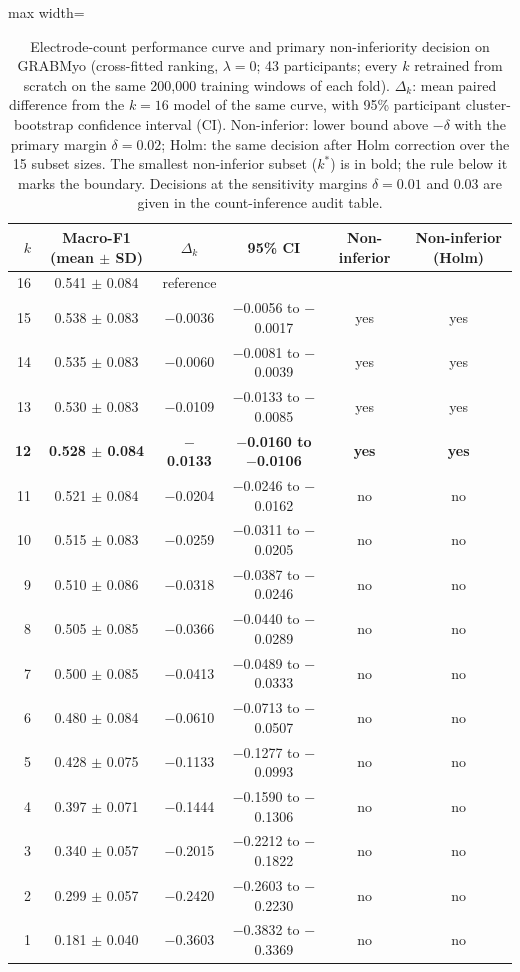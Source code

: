 \begin{table}[htbp]
\centering
\small
\caption{Electrode-count performance curve and primary non-inferiority decision on GRABMyo (cross-fitted ranking, $\lambda = 0$; 43 participants; every $k$ retrained from scratch on the same 200,000 training windows of each fold). $\Delta_k$: mean paired difference from the $k = 16$ model of the same curve, with 95\% participant cluster-bootstrap confidence interval (CI). Non-inferior: lower bound above $-\delta$ with the primary margin $\delta = 0.02$; Holm: the same decision after Holm correction over the 15 subset sizes. The smallest non-inferior subset ($k^*$) is in bold; the rule below it marks the boundary. Decisions at the sensitivity margins $\delta = 0.01$ and 0.03 are given in the count-inference audit table.}
\label{tab:sparse_ni}
\setlength{\tabcolsep}{4pt}
\begin{adjustbox}{max width=\textwidth}
\begin{tabular}{rccccc}
\toprule
$k$ & Macro-F1 (mean $\pm$ SD) & $\Delta_k$ & 95\% CI & Non-inferior & Non-inferior (Holm) \\
\midrule
16 & 0.541 $\pm$ 0.084 & reference &  &  &  \\
15 & 0.538 $\pm$ 0.083 & $-$0.0036 & $-$0.0056 to $-$0.0017 & yes & yes \\
14 & 0.535 $\pm$ 0.083 & $-$0.0060 & $-$0.0081 to $-$0.0039 & yes & yes \\
13 & 0.530 $\pm$ 0.083 & $-$0.0109 & $-$0.0133 to $-$0.0085 & yes & yes \\
\textbf{12} & \textbf{0.528 $\pm$ 0.084} & \textbf{$-$0.0133} & \textbf{$-$0.0160 to $-$0.0106} & \textbf{yes} & \textbf{yes} \\
\midrule 11 & 0.521 $\pm$ 0.084 & $-$0.0204 & $-$0.0246 to $-$0.0162 & no & no \\
10 & 0.515 $\pm$ 0.083 & $-$0.0259 & $-$0.0311 to $-$0.0205 & no & no \\
9 & 0.510 $\pm$ 0.086 & $-$0.0318 & $-$0.0387 to $-$0.0246 & no & no \\
8 & 0.505 $\pm$ 0.085 & $-$0.0366 & $-$0.0440 to $-$0.0289 & no & no \\
7 & 0.500 $\pm$ 0.085 & $-$0.0413 & $-$0.0489 to $-$0.0333 & no & no \\
6 & 0.480 $\pm$ 0.084 & $-$0.0610 & $-$0.0713 to $-$0.0507 & no & no \\
5 & 0.428 $\pm$ 0.075 & $-$0.1133 & $-$0.1277 to $-$0.0993 & no & no \\
4 & 0.397 $\pm$ 0.071 & $-$0.1444 & $-$0.1590 to $-$0.1306 & no & no \\
3 & 0.340 $\pm$ 0.057 & $-$0.2015 & $-$0.2212 to $-$0.1822 & no & no \\
2 & 0.299 $\pm$ 0.057 & $-$0.2420 & $-$0.2603 to $-$0.2230 & no & no \\
1 & 0.181 $\pm$ 0.040 & $-$0.3603 & $-$0.3832 to $-$0.3369 & no & no \\
\bottomrule
\end{tabular}
\end{adjustbox}
\end{table}
